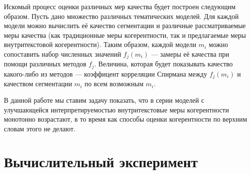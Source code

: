 Искомый процесс оценки различных мер качества будет построен следующим образом. Пусть дано множество различных тематических моделей. Для каждой модели можно вычислить её качество сегментации и различные рассматриваемые меры качества (как традиционные меры когерентности, так и предлагаемые меры внутритекстовой когерентности). Таким образом, каждой модели $m_i$ можно сопоставить набор численных значений $f_j(m_i)$ --- замеры её качества при помощи различных методов $f_j$. Величина, которая будет показывать качество какого-либо из методов --- коэффицент корреляции Спирмана между $f_j(m_i)$ и качеством сегментации $m_i$ по всем возможным $m_i$.

В данной работе мы ставим задачу показать, что в серии моделей с улучшающейся интерпретируемостью внутритекстовые меры когерентности монотонно возрастают, в то время как способы оценки когерентности по верхним словам этого не делают.

\section{Вычислительный эксперимент}

